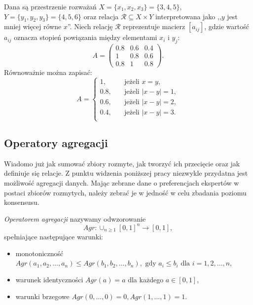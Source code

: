 \begin{example}
Dana są przestrzenie rozważań $X=\{ x_1,x_2,x_3 \} = \{3,4,5\}$,
$Y=\{y_1,y_2,y_3\} = \{4,5,6\}$ oraz relacja $\mathcal{R} \subseteq X \times Y$
interpretowana jako ,,$y$ jest mniej więcej równe $x$''. Niech relację
$\mathcal{R}$ reprezentuje macierz $[a_{ij}]$, gdzie wartość $a_{ij}$ oznacza
stopień powiązania między elementami $x_i$ i $y_j$:
$$A = 
\begin{pmatrix}
0.8 & 0.6 & 0.4 \\
  1 & 0.8 & 0.6 \\
0.8 &   1 & 0.8
\end{pmatrix}.
$$
Równoważnie można zapisać:
$$
A = 
\left\{ 
	\begin{array}{cl}
	  1, & \quad \textrm{jeżeli } x = y, \\
      0.8, & \quad \textrm{jeżeli } |x - y| = 1, \\
      0.6, & \quad \textrm{jeżeli } |x - y| = 2, \\
      0.4, & \quad \textrm{jeżeli } |x - y| = 3. \\
  	\end{array} 
  \right.
$$
\end{example}

\subsection{Operatory agregacji}
Wiadomo już jak sumować zbiory rozmyte, jak tworzyć ich przecięcie oraz jak
definiuje się relacje. Z punktu widzenia poniższej pracy niezwykle przydatna
jest możliwość agregacji danych. Mając zebrane dane o preferencjach ekspertów w
postaci zbiorów rozmytych, należy zebrać je w jedność w celu zbadania poziomu
konsensusu.

\begin{definition}
\emph{Operatorem agregacji} nazywamy odwzorowanie
$$
Agr: \cup_{n \geq 1} [0,1]^n \rightarrow [0,1],
$$
spełniające następujące warunki:
\begin{itemize}
  \item monotoniczność $Agr(a_1, a_2, \dotsc, a_n) \leq Agr(b_1, b_2, \dotsc,
  b_n), \text{ gdy } a_i \leq b_i \text{ dla } i=1,2,\dotsc,n$,
  \item warunek identyczności $Agr(a) = a$ dla każdego $a \in [0,1]$,
  \item warunki brzegowe $Agr(0, \dotsc, 0) = 0, Agr(1, \dotsc, 1) = 1$.
\end{itemize}
\end{definition}

